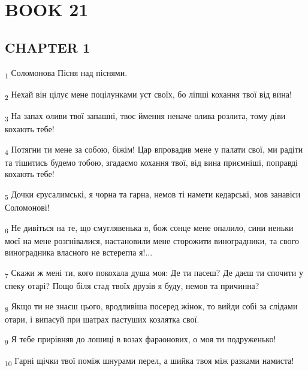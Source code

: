 \section{BOOK 21}
\subsection{CHAPTER 1}
\begin{tcolorbox}
\textsubscript{1} Соломонова Пісня над піснями.
\end{tcolorbox}
\begin{tcolorbox}
\textsubscript{2} Нехай він цілує мене поцілунками уст своїх, бо ліпші кохання твої від вина!
\end{tcolorbox}
\begin{tcolorbox}
\textsubscript{3} На запах оливи твої запашні, твоє ймення неначе олива розлита, тому діви кохають тебе!
\end{tcolorbox}
\begin{tcolorbox}
\textsubscript{4} Потягни ти мене за собою, біжім! Цар впровадив мене у палати свої, ми радіти та тішитись будемо тобою, згадаємо кохання твої, від вина приємніші, поправді кохають тебе!
\end{tcolorbox}
\begin{tcolorbox}
\textsubscript{5} Дочки єрусалимські, я чорна та гарна, немов ті намети кедарські, мов занавіси Соломонові!
\end{tcolorbox}
\begin{tcolorbox}
\textsubscript{6} Не дивіться на те, що смуглявенька я, бож сонце мене опалило, сини неньки моєї на мене розгнівалися, настановили мене сторожити виноградники, та свого виноградника власного не встерегла я!...
\end{tcolorbox}
\begin{tcolorbox}
\textsubscript{7} Скажи ж мені ти, кого покохала душа моя: Де ти пасеш? Де даєш ти спочити у спеку отарі? Пощо біля стад твоїх друзів я буду, немов та причинна?
\end{tcolorbox}
\begin{tcolorbox}
\textsubscript{8} Якщо ти не знаєш цього, вродливіша посеред жінок, то вийди собі за слідами отари, і випасуй при шатрах пастуших козлятка свої.
\end{tcolorbox}
\begin{tcolorbox}
\textsubscript{9} Я тебе прирівняв до лошиці в возах фараонових, о моя ти подруженько!
\end{tcolorbox}
\begin{tcolorbox}
\textsubscript{10} Гарні щічки твої поміж шнурами перел, а шийка твоя між разками намиста!
\end{tcolorbox}
